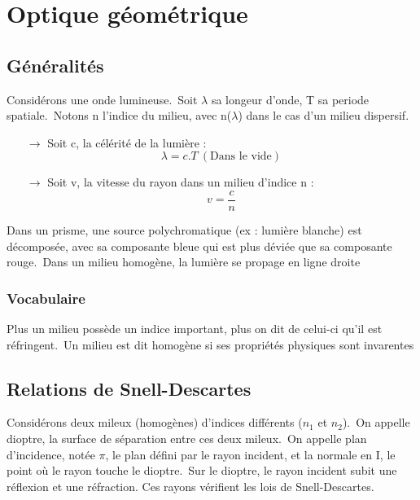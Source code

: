
\chapter{Optique géométrique}

\section{Généralités}

Considérons une onde lumineuse.\
Soit $\lambda$ sa longeur d'onde, T sa periode spatiale.\
Notons n l'indice du milieu, avec n($\lambda$) dans le cas d'un milieu dispersif.

\begin{itemize}
 \item[$\rightarrow$] Soit c, la célérité de la lumière : $$\lambda = c.T~ (\mbox{Dans le vide})$$
 \item[$\rightarrow$] Soit v, la vitesse du rayon dans un milieu d'indice n : $$v = \dfrac{c}{n}$$
\end{itemize}

Dans un prisme, une source polychromatique (ex : lumière blanche) est décomposée, avec sa composante bleue qui est plus déviée que sa composante rouge.\
Dans un milieu homogène, la lumière se propage en ligne droite

\subsection{Vocabulaire}

Plus un milieu possède un indice important, plus on dit de celui-ci qu'il est réfringent.\
Un milieu est dit homogène si ses propriétés physiques sont invarentes

\section{Relations de Snell-Descartes}

\begin{de}
Considérons deux mileux (homogènes) d'indices différents ($n_1$ et $n_2$).\
On appelle dioptre, la surface de séparation entre ces deux mileux.\
On appelle plan d'incidence, notée $\pi$, le plan défini par le rayon incident, et la normale en I, le point où le rayon touche le dioptre.\
Sur le dioptre, le rayon incident subit une réflexion et une réfraction. Ces rayons vérifient les lois de Snell-Descartes.
\end{de}

